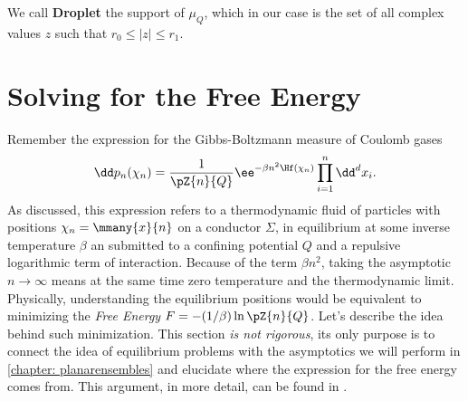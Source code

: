 \begin{definicao} \label{Definition: Droplet}
	We call \textbf{Droplet} the support of $\mu_Q$, which in our case is the set of all complex values $z$ such that $r_0 \leq |z| \leq r_1$.
\end{definicao}

\section{Solving for the Free Energy}
\label{Section: Free eenrgy}

Remember the expression for the Gibbs-Boltzmann measure of Coulomb gases 
\begin{equation}
	\dd p_n ({\chi_n}) = \frac{1}{\pZ{n}{Q}} \ee^{-\beta n^2 \Hf(\chi_n)} \prod_{i = 1}^{n} \dd^d x_i.
\end{equation}
As discussed, this expression refers to a thermodynamic fluid of particles with positions ${\chi_n} = \mmany{x}{n}$ on a conductor $\Sigma$, in equilibrium at some inverse temperature $\beta$ an submitted to a confining potential $Q$ and a repulsive logarithmic term of interaction.  Because of the term $\beta n^2$, taking the asymptotic $n \rightarrow \infty$ means at the same time zero temperature and the thermodynamic limit. Physically, understanding the equilibrium positions would be equivalent to minimizing the \textit{Free Energy} $F = - (1/\beta) \ln \pZ{n}{Q}$. Let's describe the idea behind such minimization. This section \textit{is not rigorous}, its only purpose is to connect the idea of equilibrium problems with the asymptotics we will perform in \autoref{chapter: planarensembles} and elucidate where the expression for the free energy comes from. This argument, in more detail, can be found in .

